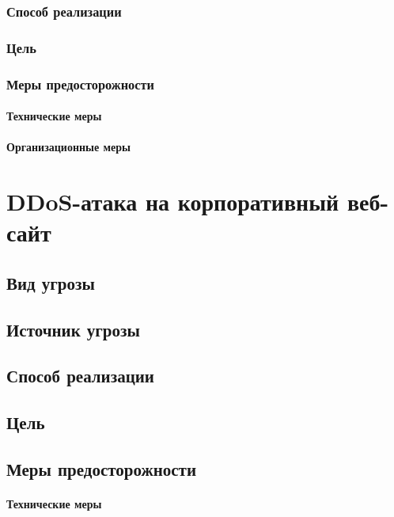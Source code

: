 \documentclass[a4paper,12pt]{article}
\begin{document}
	\subsubsection{Способ реализации}
	\lipsum[5]
	
	\subsubsection{Цель}
	\lipsum[6]
	
	\subsubsection{Меры предосторожности}
	\paragraph{Технические меры}
	\lipsum[7]
	
	\paragraph{Организационные меры}
	\lipsum[8]
	
	\section{DDoS-атака на корпоративный веб-сайт}
	\subsection{Вид угрозы}
	\lipsum[9]
	
	\subsection{Источник угрозы}
	\lipsum[10]
	
	\subsection{Способ реализации}
	\lipsum[11]
	
	\subsection{Цель}
	\lipsum[12]
	
	\subsection{Меры предосторожности}
	\paragraph{Технические меры}
	\lipsum[13]
	
	\newpage %
	
\end{document}
